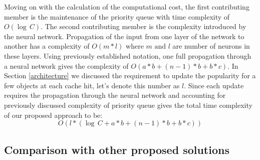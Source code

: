Moving on with the calculation of the computational cost, the first contributing member is the maintenance of the priority queue with time complexity of $ O(\log\,C) $. The second contributing member is the complexity introduced by the neural network. Propagation of the input from one layer of the network to another has a complexity of $ O(m*l) $ where $m \text{ and } l$ are number of neurons in these layers. Using previously established notation, one full propagation through a neural network gives the complexity of $ O(a*b + (n-1)*b + b*c)$. In Section \ref{architecture} we discussed the requirement to update the popularity for a few objects at each cache hit, let's denote this number as $l$. Since each update requires the propagation through the neural network and accounting for previously discussed complexity of priority queue gives the total time complexity of our proposed approach to be: $$ O(l * (\log \, C + a*b + (n-1)*b + b*c)) $$


\subsection{Comparison with other proposed solutions} \label{comparison}

